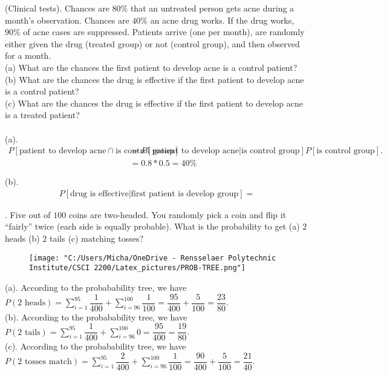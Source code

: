 \documentclass{article}
\begin{document}
\begin{addmargin}[2em]{2em}
	 (Clinical tests). Chances are $80\%$ that an untreated person gets acne during a month’s observation.
	Chances are $40\%$ an acne drug works. If the drug works, $90\%$ of acne cases are suppressed. Patients arrive (one per month), are randomly either given the drug (treated group) or not (control group), and then observed for a month.\\
	(a) What are the chances the first patient to develop acne is a control patient?\\
	(b) What are the chances the drug is effective if the first patient to develop acne is a control patient?\\
	(c) What are the chances the drug is effective if the first patient to develop acne is a treated patient?\\\\
	(a).
	\begin{align*}
		P[\text{patient to develop acne} \cap \text{is control group}] &= P[\text{patient to develop acne}|\text{is control group}]P[\text{is control group}].\\
		& = 0.8*0.5 = 40\%\\\\
	\end{align*}
	(b).
	\begin{align*}
		P[\text{drug is effective}|\text{first patient is develop group}] = 
	\end{align*}
\end{addmargin}


\clearpage

\begin{addmargin}[2em]{2em}
	. Five out of $100$ coins are two-headed. You randomly pick a coin and flip it “fairly” twice (each side
	is equally probable). What is the probability to get (a) $2$ heads (b) $2$ tails (c) matching tosses?
	
	\begin{figure}[ht]
		\texttt{[image: "C:/Users/Micha/OneDrive - Rensselaer Polytechnic Institute/CSCI 2200/Latex\_pictures/PROB-TREE.png"]}
	\end{figure}
	(a). According to the probabability tree, we have $P(\text{2 heads}) = \sum_{i=1}^{95} \dfrac{1}{400} + \sum_{i=96}^{100} \dfrac{1}{100} = \dfrac{95}{400}+\dfrac{5}{100} = \dfrac{23}{80}$.\\
	
	(b). According to the probabability tree, we have $P(\text{2 tails}) = \sum_{i=1}^{95} \dfrac{1}{400} + \sum_{i=96}^{100} 0 = \dfrac{95}{400} =  \dfrac{19}{80}$.\\
	
	(c). According to the probabability tree, we have $P(\text{2 tosses match}) = \sum_{i=1}^{95} \dfrac{2}{400} + \sum_{i=96}^{100} \dfrac{1}{100} = \dfrac{90}{400}+\dfrac{5}{100} = \dfrac{21}{40}$.
\end{addmargin}
\end{document}
